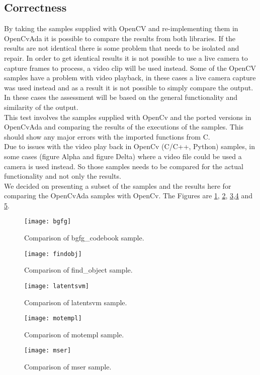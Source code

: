 \subsection{Correctness}
By taking the samples supplied with OpenCV and re-implementing them in OpenCvAda it is possible to compare the results from both libraries. If the results are not identical there is some problem that needs to be isolated and repair. In order to get identical results it is not possible to use a live camera to capture frames to process, a video clip will be used instead. Some of the OpenCV samples have a problem with video playback, in these cases a live camera capture was used instead and as a result it is not possible to simply compare the output. In these cases the assessment will be based on the general functionality and similarity of the output.
\\
This test involves the samples supplied with OpenCv and the ported versions in OpenCvAda and comparing the results of the executions of the samples. This should show any major errors with the imported functions from C.
\\
Due to issues with the video play back in OpenCv (C/C++, Python) samples, in some cases (figure Alpha and figure Delta) where a video file could be used a camera is used instead. So those samples needs to be compared for the actual functionality and not only the results.
\\
We decided on presenting a subset of the samples and the results here for comparing the OpenCvAda samples with OpenCv. The Figures are \ref{fig:bgfg}, \ref{fig:findobj}, \ref{fig:latentsvm},\ref{fig:motempl} and \ref{fig:mser}.
\begin{figure}
\centering
\texttt{[image: bgfg]}
\caption{Comparison of bgfg_codebook sample.}
\label{fig:bgfg}
\end{figure}
\begin{figure}
\centering
\texttt{[image: findobj]}
\caption{Comparison of find_object sample.}
\label{fig:findobj}
\end{figure}
\begin{figure}
\centering
\texttt{[image: latentsvm]}
\caption{Comparison of latentsvm sample.}
\label{fig:latentsvm}
\end{figure}
\begin{figure}
\centering
\texttt{[image: motempl]}
\caption{Comparison of motempl sample.}
\label{fig:motempl}
\end{figure}
\begin{figure}
\centering
\texttt{[image: mser]}
\caption{Comparison of mser sample.}
\label{fig:mser}
\end{figure}
